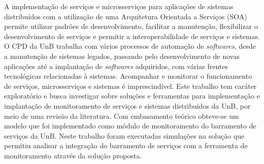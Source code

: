A implementação de serviços e microsserviços para aplicações de sistemas distribuídos com a utilização de uma Arquitetura Orientada a Serviços (\acrshort{SOA}) permite utilizar padrões de desenvolvimento, facilitar a manutenção, flexibilizar o desenvolvimento de serviços e permitir a interoperabilidade de serviços e sistemas. O \acrfull{CPD} da \acrfull{UnB} trabalha com vários processos de automação de \textit{softwares}, desde a manutenção de sistemas legados, passando pelo desenvolvimento de novas aplicações até a implantação de \textit{softwares} adquiridos, com várias frentes tecnológicas relacionadas à sistemas. Acompanhar e monitorar o funcionamento de serviços, microsserviços e sistemas é imprescindível. Este trabalho tem caráter exploratório e busca investigar sobre soluções e ferramentas para implementação e implantação de monitoramento de serviços e sistemas distribuídos da \acrfull{UnB}, por meio de uma revisão da literatura. Com embasamento teórico obteve-se um modelo que foi implementado como módulo de monitoramento do barramento de serviços da \acrfull{UnB}. Neste trabalho foram executadas simulações na solução que permitiu analisar a integração do barramento de serviços com a ferramenta de monitoramento através da solução proposta.